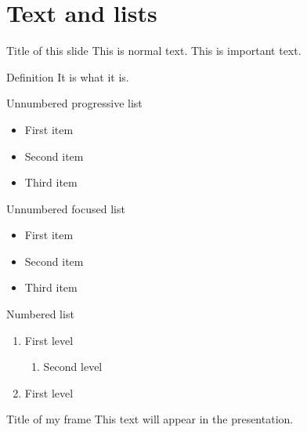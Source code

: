 \section{Text and lists}

\begin{frame}{Title of this slide}
 This is normal text. This is \alert{important text}.
 \begin{block}{Definition}
  It is what it is.
 \end{block}
\end{frame}

\begin{frame}{Unnumbered progressive list}
 \begin{itemize}
  \item<1-> First item
  \item<2-> Second item
  \item<3-> Third item
 \end{itemize}
\end{frame}

\begin{frame}{Unnumbered focused list}
 \begin{itemize}
  \item<1> First item
  \item<2> Second item
  \item<3> Third item
 \end{itemize}
\end{frame}

\begin{frame}{Numbered list}
 \begin{enumerate}
  \item First level
  \begin{enumerate}
   \item Second level
  \end{enumerate}
  \item First level
 \end{enumerate}
\end{frame}

\begin{frame}{Title of my frame}
 This text will appear in the presentation. 
\end{frame}


